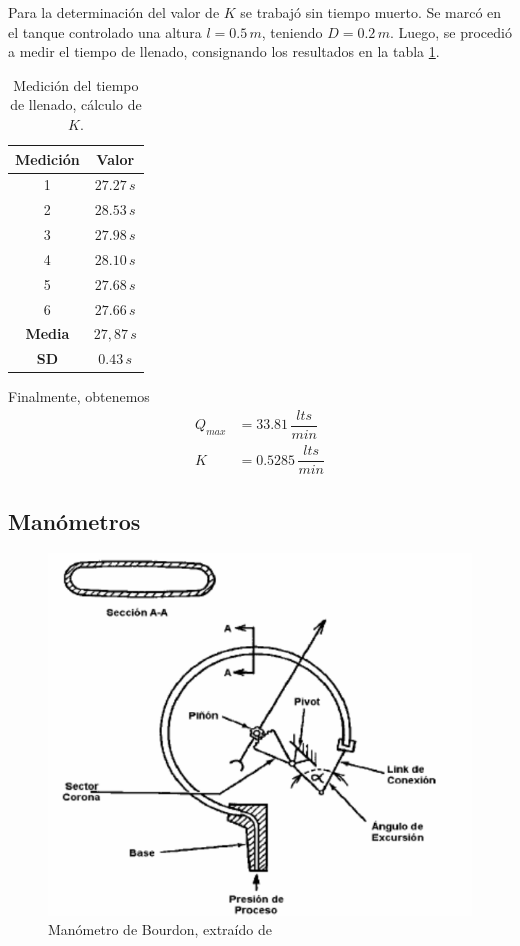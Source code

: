 Para la determinación del valor de $K$ se trabajó sin tiempo muerto.
Se marcó en el tanque controlado una altura $l=0.5\,m$, teniendo $D=0.2\,m$.
Luego, se procedió a medir el tiempo de llenado, consignando los resultados en
la tabla \ref{tab:tiempoK}.

\begin{table}
  \centering
  \bgroup
  \begin{tabular}{|c|c|}
  \hline
  Medición & Valor\\
  \hline
  1 & $27.27\,s$ \\
  2 & $28.53\,s$ \\
  3 & $27.98\,s$ \\
  4 & $28.10\,s$ \\
  5 & $27.68\,s$ \\
  6 & $27.66\,s$ \\
  \hline
  \hline
  \textbf{Media} & $27,87\,s$\\
  \textbf{SD} & $0.43\,s$\\
  \hline
  \end{tabular}
  \egroup
  \caption{Medición del tiempo de llenado, cálculo de $K$.}
  \label{tab:tiempoK}
\end{table}

Finalmente, obtenemos
\begin{align}
 Q_{max} &= 33.81\,\dfrac{lts}{min}
 \\
 K  &= 0.5285\,\dfrac{lts}{min}
\end{align}

\subsection{Manómetros}
\label{subsec:Manometros}

\begin{figure}[ht]
 \centering
 \includegraphics[width=.7\textwidth]{Cap2-DisenoEnsamblado/images/manomBourdon.png}
 \caption{Manómetro de Bourdon, extraído de \cite{bib:ApuntesPuglesiPlacaOrif}}
 \label{fig:manometroBourdon}
\end{figure}

